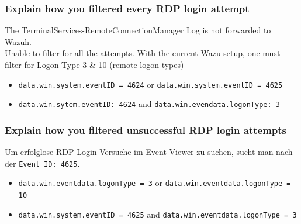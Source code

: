 \subsubsection{Explain how you filtered every RDP login attempt}
The TerminalServices-RemoteConnectionManager Log is not forwarded to Wazuh.\\
Unable to filter for all the attempts. With the current Wazu setup, one must filter for Logon Type 3 \& 10 (remote logon types)\\

\begin{itemize}
    \item \lstinline|data.win.system.eventID = 4624| or \lstinline|data.win.system.eventID = 4625|
    \item \lstinline|data.win.sytem.eventID: 4624| and \lstinline|data.win.evendata.logonType: 3|
\end{itemize}

\subsubsection{Explain how you filtered unsuccessful RDP login attempts}
Um erfolglose RDP Login Versuche im Event Viewer zu suchen, sucht man nach der \lstinline|Event ID: 4625|.\\

\begin{itemize}
    \item \lstinline|data.win.eventdata.logonType = 3| or \lstinline|data.win.eventdata.logonType = 10|
    \item \lstinline|data.win.system.eventID = 4625| and \lstinline|data.win.eventdata.logonType = 3|
\end{itemize}
